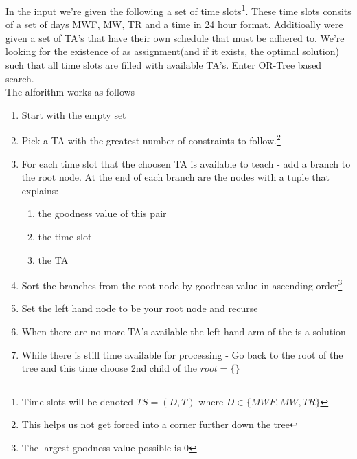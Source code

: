 \documentclass{article}
\begin{document}
In the input we're given the following a set of time
slots\footnote{Time slots will be denoted $TS = (D, T)$ where $D \in
  \{MWF, MW, TR\}$}. These time slots consits of a set of days MWF,
MW, TR and a time in 24 hour format. Additioally were given a set of
TA's that have their own schedule that must be adhered to. We're
looking for the existence of as assignment(and if it exists, the
optimal solution) such that all time slots are filled with available
TA's. Enter OR-Tree based search.\\

The alforithm works as follows

\begin{enumerate}

\item Start with the empty set

\item Pick a TA with the greatest number of constraints to
  follow.\footnote{This helps us not get forced into a corner further
    down the tree}

\item For each time slot that the choosen TA is available to teach -
  add a branch to the root node. At the end of each branch are the
  nodes with a tuple that explains:
  
  \begin{enumerate}

  \item the goodness value of this pair
    
  \item the time slot

  \item the TA

  \end{enumerate}

\item Sort the branches from the root node by goodness value in
  ascending order\footnote{The largest goodness value possible is 0}


\item Set the left hand node to be your root node and recurse

\item When there are no more TA's available the left hand arm of the
  is a solution

\item While there is still time available for processing - Go back to
  the root of the tree and this time choose 2nd child of the $root =
  \{\}$

\end{enumerate}
\end{document}
